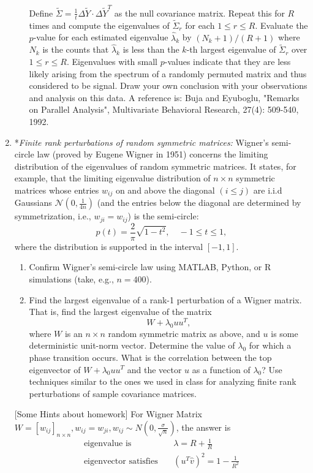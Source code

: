 \documentclass[11pt]{article}
\begin{document}
\begin{enumerate}
\begin{enumerate}
\[\]
Define $\tilde{\Sigma} = \frac{1}{t} \Delta \tilde{Y} \cdot \Delta \tilde{Y}^T$ as the null covariance matrix. Repeat this for $R$ times and compute the eigenvalues of $\tilde{\Sigma}_r$ for each $1\leq r\leq R$. Evaluate the $p$-value for each estimated eigenvalue $\hat{\lambda}_k$ by $(N_k + 1)/(R+1)$ where $N_k$ is the counts that $\hat{\lambda}_k$ is less than the $k$-th largest eigenvalue of $\tilde{\Sigma}_r$ over $1\leq r \leq R$. Eigenvalues with small $p$-values indicate that they are less likely arising from the spectrum of a randomly permuted matrix and thus considered to be signal. Draw your own conclusion with your observations and analysis on this data. A reference is: Buja and Eyuboglu, "Remarks on Parallel Analysis", Multivariate Behavioral Research, 27(4): 509-540, 1992.
\end{enumerate}

\item *{\em Finite rank perturbations of random symmetric matrices:} Wigner's semi-circle law (proved by Eugene Wigner in 1951) concerns the limiting distribution of the eigenvalues of random symmetric matrices. It states, for example, that the limiting eigenvalue distribution of $n\times n$ symmetric matrices whose entries $w_{ij}$ on and above the diagonal $(i\leq j)$ are i.i.d Gaussians $\mathcal{N}(0,\frac{1}{4n})$ (and the entries below the diagonal are determined by symmetrization, i.e., $w_{ji}=w_{ij}$) is the semi-circle:
    $$p(t) = \frac{2}{\pi} \sqrt{1-t^2}, \quad -1\leq t \leq 1,$$
    where the distribution is supported in the interval $[-1,1]$.
\begin{enumerate}
\item Confirm Wigner's semi-circle law using MATLAB, Python, or R simulations (take, e.g., $n=400$).
\item Find the largest eigenvalue of a rank-1 perturbation of a Wigner matrix. That is, find the largest eigenvalue of the matrix $$W + \lambda_0 uu^T,$$ where $W$ is an $n\times n$ random symmetric matrix as above, and $u$ is some deterministic unit-norm vector. Determine the value of $\lambda_0$ for which a phase transition occurs. What is the correlation between the top eigenvector of $W+\lambda_0 uu^T$ and the vector $u$ as a function of $\lambda_0$? Use techniques similar to the ones we used in class for analyzing finite rank perturbations of sample covariance matrices.
\end{enumerate} 

[Some Hints about homework] For Wigner Matrix\ $W=[w_{ij}]_{n\times n},w_{ij}=w_{ji},w_{ij}\sim N(0,\frac{\sigma}{\sqrt{n}})$, 
 the answer is
$$
\begin{array}{rcl}
\textrm{eigenvalue\ is}\ & &\lambda=R+\frac{1}{R}\\
\textrm{eigenvector\ satisfies}\ && (u^{T}\hat{v})^{2}=1-\frac{1}{R^{2}} \\
\end{array}
$$



\end{enumerate}
\end{document}
